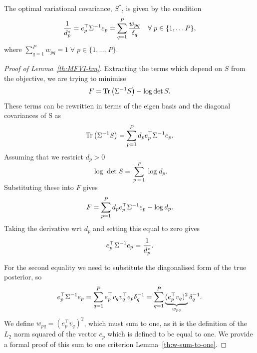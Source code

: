 \begin{lemma*}  
    The optimal variational covariance, $S^*$, is given by the condition
    \begin{equation}
        \frac{1}{d_p^*} = {e_p^\top \Sigma^{-1} e_p} = {\sum_{q=1}^P \frac{w_{pq}}{\delta_q}} \quad \forall \; p \in \{1, \dots P\},
    \end{equation}
    where $\sum_{q=1}^P w_{pq} = 1 \; \forall \; p \in \{1, \dots, P\}$.
\end{lemma*}
\begin{proof}[Proof of Lemma~\ref{th:MFVI-hm}]
    Extracting the terms which depend on $S$ from the objective, we are trying to minimise 
    \begin{equation}
        F = \text{Tr}\left(\Sigma^{-1}S\right) - \log \det S. 
    \end{equation}
    These terms can be rewritten in terms of the eigen basis and the diagonal covariances of S as 
    \begin{equation}
        \text{Tr}\left(\Sigma^{-1}S\right)  = \sum_{p=1}^P d_p e_p^\top  \Sigma^{-1} e_p.
    \end{equation}
    Assuming that we restrict $d_p > 0$
    \begin{equation}
        \log \det S = \sum_{p=1}^P \log d_p.
    \end{equation}
    Substituting these into $F$ gives
    \begin{equation}
        F = \sum_{p=1}^P d_p e_p^\top  \Sigma^{-1} e_p - \log d_p.
    \end{equation}
    Taking the derivative wrt $d_p$ and setting this equal to zero gives 
    \begin{equation}
        e_p^\top  \Sigma^{-1}e_p = \frac{1}{d^*_p}.
    \end{equation}
     

    For the second equality we need to substitute the diagonalised form of the true posterior, so 
    \begin{equation}
        e_p^\top  \Sigma^{-1}e_p = \sum_{q=1}^P e_p^\top  v_q v_q^\top  e_p \delta_q^{-1} = \sum_{q=1}^P \underbrace{(e_p^\top  v_q)^2 }_{w_{pq}}\delta_q^{-1}. 
    \end{equation}
    We define $w_{pq} = (e_p^\top  v_q)^2$, which must sum to one, as it is the definition of the $L_2$ norm squared of the vector $e_p$ which is defined to be equal to one. We provide a formal proof of this sum to one criterion 
    Lemma~\ref{th:w-sum-to-one}. 
    
\end{proof}


